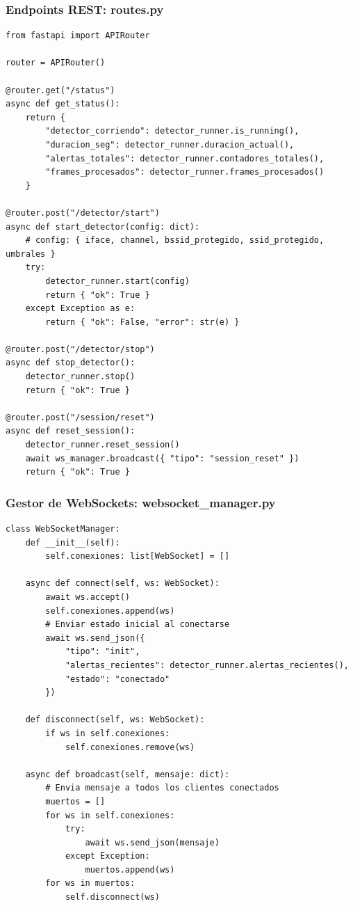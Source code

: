 \documentclass[11pt,a4paper]{article}
\begin{document}
\subsubsection{Endpoints REST: routes.py}

\begin{lstlisting}
from fastapi import APIRouter

router = APIRouter()

@router.get("/status")
async def get_status():
    return {
        "detector_corriendo": detector_runner.is_running(),
        "duracion_seg": detector_runner.duracion_actual(),
        "alertas_totales": detector_runner.contadores_totales(),
        "frames_procesados": detector_runner.frames_procesados()
    }

@router.post("/detector/start")
async def start_detector(config: dict):
    # config: { iface, channel, bssid_protegido, ssid_protegido, umbrales }
    try:
        detector_runner.start(config)
        return { "ok": True }
    except Exception as e:
        return { "ok": False, "error": str(e) }

@router.post("/detector/stop")
async def stop_detector():
    detector_runner.stop()
    return { "ok": True }

@router.post("/session/reset")
async def reset_session():
    detector_runner.reset_session()
    await ws_manager.broadcast({ "tipo": "session_reset" })
    return { "ok": True }
\end{lstlisting}

\subsubsection{Gestor de WebSockets: websocket_manager.py}

\begin{lstlisting}
class WebSocketManager:
    def __init__(self):
        self.conexiones: list[WebSocket] = []

    async def connect(self, ws: WebSocket):
        await ws.accept()
        self.conexiones.append(ws)
        # Enviar estado inicial al conectarse
        await ws.send_json({
            "tipo": "init",
            "alertas_recientes": detector_runner.alertas_recientes(),
            "estado": "conectado"
        })

    def disconnect(self, ws: WebSocket):
        if ws in self.conexiones:
            self.conexiones.remove(ws)

    async def broadcast(self, mensaje: dict):
        # Envia mensaje a todos los clientes conectados
        muertos = []
        for ws in self.conexiones:
            try:
                await ws.send_json(mensaje)
            except Exception:
                muertos.append(ws)
        for ws in muertos:
            self.disconnect(ws)
\end{lstlisting}
\end{document}

